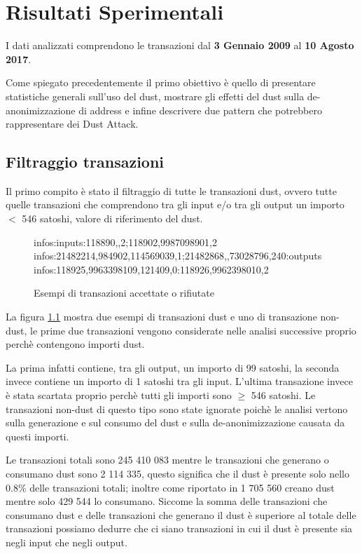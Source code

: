\chapter{Risultati Sperimentali}
\captionsetup[table]{name=Tabella}
I dati analizzati comprendono le transazioni dal \textbf{3 Gennaio 2009} al \textbf{10 Agosto 2017}.

Come spiegato precedentemente il primo obiettivo è quello di presentare statistiche generali sull'uso del dust, mostrare gli effetti del dust sulla de-anonimizzazione di address e infine descrivere due pattern che potrebbero rappresentare dei Dust Attack.
\section{Filtraggio transazioni}
Il primo compito è stato il filtraggio di tutte le transazioni dust, ovvero tutte quelle transazioni che comprendono tra gli input e/o tra gli output un importo $<$ 546 satoshi, valore di riferimento del dust.
\begin{figure}[H]
\begin{mdframed}
 infos:inputs:118890,,2;118902,9987098901,2 \checkmark\\
 infos:21482214,984902,114569039,1;21482868,,73028796,240:outputs \checkmark\\
 infos:118925,9963398109,121409,0:118926,9962398010,2 
\end{mdframed}
\caption{Esempi di transazioni accettate o rifiutate}
\label{tx_dust}
\end{figure}
\Floatbarrier
La figura \ref{tx_dust} mostra due esempi di transazioni dust e uno di transazione non-dust, le prime due transazioni vengono considerate nelle analisi successive proprio perchè contengono importi dust. 

La prima infatti contiene, tra gli output, un importo di 99 satoshi, la seconda invece contiene un importo di 1 satoshi tra gli input. L'ultima transazione invece è stata scartata proprio perchè tutti gli importi sono $\ge$ 546 satoshi. Le transazioni non-dust di questo tipo sono state ignorate poichè le analisi vertono sulla generazione e sul consumo del dust e sulla de-anonimizzazione causata da questi importi.

Le transazioni totali sono 245 410 083 mentre le transazioni che generano o consumano dust sono  2 114 335, questo significa che il dust è presente solo nello 0.8\% delle transazioni totali; inoltre come riportato in \cite{dustAnalisi} 1 705 560 creano dust mentre solo 429 544 lo consumano. Siccome la somma delle transazioni che consumano dust e delle transazioni che generano il dust è superiore al totale delle transazioni possiamo dedurre che ci siano transazioni in cui il dust è presente sia negli input che negli output.

